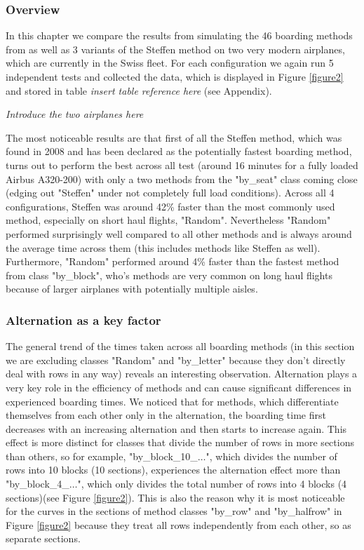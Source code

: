 \documentclass[11pt]{article}
\begin{document}
 
 \subsubsection{Overview}
 In this chapter we compare the results from simulating the 46 boarding methods from \cite{beus} as well as 3 variants of the Steffen method \cite{steffen} on two very modern airplanes, which are currently in the Swiss fleet. For each configuration we again run 5 independent tests and collected the data, which is displayed in Figure \ref{figure2} and stored in table \textit{insert table reference here} (see Appendix). 
 
 \textit{Introduce the two airplanes here}
 
 The most noticeable results are that first of all the Steffen method, which was found in 2008 and has been declared as the potentially fastest boarding method, turns out to perform the best across all test (around 16 minutes for a fully loaded Airbus A320-200) with only a two methods from the "by\_seat" class coming close (edging out "Steffen" under not completely full load conditions). Across all 4 configurations, Steffen was around 42\% faster than the most commonly used method, especially on short haul flights, "Random". Nevertheless "Random" performed surprisingly well compared to all other methods and is always around the average time across them (this includes methods like Steffen as well). Furthermore, "Random" performed around 4\% faster than the fastest method from class "by\_block", who's methods are very common on long haul flights because of larger airplanes with potentially multiple aisles.
 
 
 \subsubsection{Alternation as a key factor}\label{alternation}
 The general trend of the times taken across all boarding methods (in this section we are excluding classes "Random" and "by\_letter" because they don't directly deal with rows in any way) reveals an interesting observation. Alternation plays a very key role in the efficiency of methods and can cause significant differences in experienced boarding times. We noticed that for methods, which differentiate themselves from each other only in the alternation, the boarding time first decreases with an increasing alternation and then starts to increase again.
 This effect is more distinct for classes that divide the number of rows in more sections than others, so for example, "by\_block\_10\_$\dots$", which divides the number of rows into 10 blocks (10 sections), experiences the alternation effect more than "by\_block\_4\_$\dots$", which only divides the total number of rows into 4 blocks (4 sections)(see Figure \ref{figure2}).  This is also the reason why it is most noticeable for the curves in the sections of method classes "by\_row" and "by\_halfrow" in Figure \ref{figure2} because they treat all rows independently from each other, so as separate sections. 
 
\end{document}
